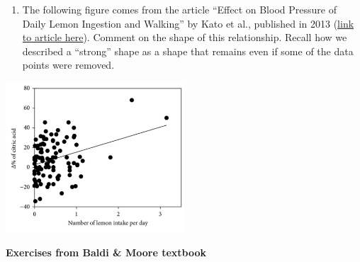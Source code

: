 \documentclass[
  letterpaper,
  DIV=11,
  numbers=noendperiod]{scrreprt}
\providecommand{\tightlist}{%
  \setlength{\itemsep}{0pt}\setlength{\parskip}{0pt}}\usepackage{longtable,booktabs,array}
\begin{document}
\begin{enumerate}
\def\labelenumi{\arabic{enumi}.}
\setcounter{enumi}{2}
\tightlist
\item
  The following figure comes from the article ``Effect on Blood Pressure
  of Daily Lemon Ingestion and Walking'' by Kato et al., published in
  2013 (\href{https://www.hindawi.com/journals/jnme/2014/912684/}{link
  to article here}). Comment on the shape of this relationship. Recall
  how we described a ``strong'' shape as a shape that remains even if
  some of the data points were removed.
\end{enumerate}

\includegraphics[width=0.5\textwidth]{figs/lemon.png}

\textbf{Exercises from Baldi \& Moore textbook}
\end{document}
